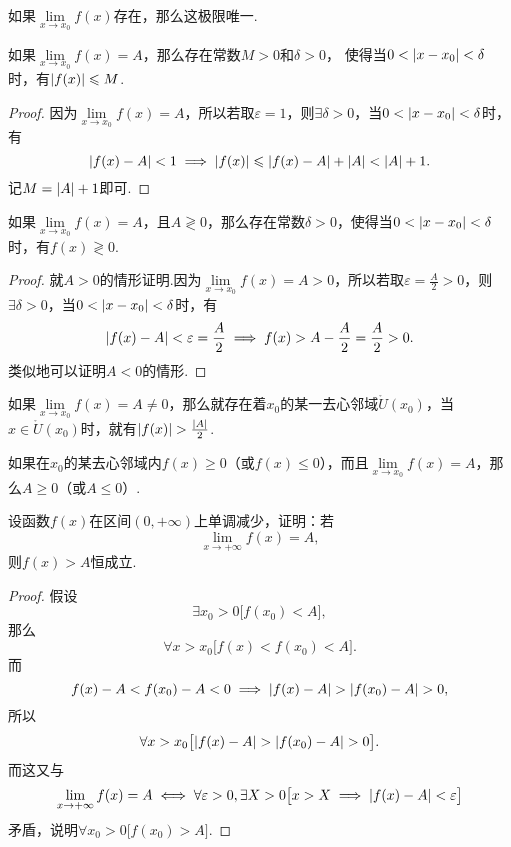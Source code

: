 \begin{theorem}[函数极限的唯一性]\label{theorem:极限.函数极限的唯一性}
如果\(\lim\limits_{x \to x_0}f(x)\)存在，那么这极限唯一.
\end{theorem}

\begin{theorem}[函数极限的局部有界性]\label{theorem:极限.函数极限的局部有界性}
如果\(\lim\limits_{x \to x_0}f(x) = A\)，那么存在常数\(M>0\)和\(\delta>0\)，%
使得当\(0<\abs{x-x_0}<\delta\)时，有\(\abs{f(x)} \leqslant M\).
\begin{proof}
因为\(\lim\limits_{x \to x_0}f(x) = A\)，所以若取\(\varepsilon = 1\)，则\(\exists \delta > 0\)，当\(0 < \abs{x - x_0} < \delta\)时，有\[
\abs{f(x) - A} < 1 \implies \abs{f(x)} \leqslant \abs{f(x) - A} + \abs{A} < \abs{A} + 1.
\]记\(M = \abs{A} + 1\)即可.
\end{proof}
\end{theorem}

\begin{theorem}[函数极限的局部保号性]\label{theorem:极限.函数极限的局部保号性1}
如果\(\lim\limits_{x \to x_0}f(x)=A\)，且\(A \gtrless 0\)，那么存在常数\(\delta>0\)，使得当\(0<\abs{x-x_0}<\delta\)时，有\(f(x) \gtrless 0\).
\begin{proof}
就\(A > 0\)的情形证明.因为\(\lim\limits_{x \to x_0}f(x) = A > 0\)，所以若取\(\varepsilon = \frac{A}{2} > 0\)，则\(\exists \delta > 0\)，当\(0 < \abs{x - x_0} < \delta\)时，有\[
\abs{f(x) - A} < \varepsilon = \frac{A}{2}
\implies f(x) > A - \frac{A}{2} = \frac{A}{2} > 0.
\]类似地可以证明\(A < 0\)的情形.
\end{proof}
\end{theorem}

\begin{theorem}\label{theorem:极限.函数极限的局部保号性2}
如果\(\lim\limits_{x \to x_0}f(x) = A \neq 0\)，那么就存在着\(x_0\)的某一去心邻域\(\mathring{U}(x_0)\)，当\(x\in\mathring{U}(x_0)\)时，就有\(\abs{f(x)}>\frac{\abs{A}}{2}\).
\end{theorem}

\begin{corollary}\label{theorem:极限.函数极限的局部保号性3}
如果在\(x_0\)的某去心邻域内\(f(x) \geqslant 0\)（或\(f(x) \leqslant 0\)），而且\(\lim\limits_{x \to x_0}f(x) = A\)，那么\(A \geqslant 0\)（或\(A \leqslant 0\)）.
\end{corollary}

\begin{example}
设函数\(f(x)\)在区间\((0,+\infty)\)上单调减少，证明：若\[
\lim\limits_{x\to+\infty}f(x)=A,
\]则\(f(x)>A\)恒成立.
\begin{proof}
假设\[
\exists x_0 > 0 \bigl[
	f(x_0) < A
\bigr],
\]那么\[
\forall x > x_0 \bigl[
	f(x) < f(x_0) < A
\bigr].
\]而\[
f(x) - A < f(x_0) - A < 0
\implies
\abs{f(x) - A} > \abs{f(x_0) - A} > 0,
\]所以\[
\forall x > x_0 \bigl[
	\abs{f(x) - A} > \abs{f(x_0) - A} > 0
\bigr].
\]而这又与\[
\lim\limits_{x\to+\infty}f(x)=A
\iff
\forall \varepsilon > 0, \exists X > 0 \bigl[
	x > X \implies \abs{f(x) - A} < \varepsilon
\bigr]
\]矛盾，说明\(\forall x_0 > 0 \bigl[
	f(x_0) > A
\bigr]\).
\end{proof}
\end{example}

